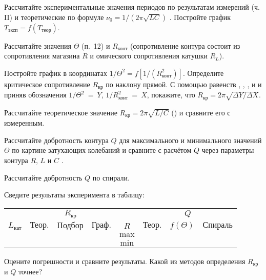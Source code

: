 \begin{lab:task}
	\item Рассчитайте экспериментальные значения периодов по результатам
измерений (ч. II) и теоретические по формуле $\nu_0 = 1/(2\pi\sqrt{LC})$
. Постройте график $T_\text{эксп} = f(T_\text{теор})$.

	\item Рассчитайте значения $\Theta$ (п.~12) и $R_\text{конт}$ (сопротивление
контура состоит из сопротивления магазина $R$ и омического сопротивления катушки
$R_L$).

Постройте график в координатах $1/\Theta^2 =f[1/(R^2_\text{конт})]$. Определите
критическое сопротивление $R_\text{кр}$  по наклону прямой. С помощью равенств
, , , и
 и приняв обозначения $1/\Theta^2~=~Y$, $1/
R^2_\text{конт}~=~X$, покажите, что $R_\text{кр} = 2\pi\sqrt{\Delta Y / \Delta
X}$.

	\item Рассчитайте теоретическое значение $R_\text{кр} = 2\pi\sqrt{L / C}$
() и сравните его с измеренным.

	\item Рассчитайте добротность контура $Q$ для максимального и минимального
значений $\Theta$ по картине затухающих колебаний и сравните с расчётом $Q$
через параметры контура $R$, $L$  и $C$  .

	\item Рассчитайте добротность $Q$ по спирали.

	\item Сведите результаты эксперимента в таблицу:

\begin{center}
\begin{tabular}{|c|c|c|c|c|c|c|c|}
\hline
& \multicolumn{3}{c|}{$R_{\text{кр}}$} &  & \multicolumn{3}{c|}{$Q$} \\
\cline{2-4}
\cline{6-8}
$L_{\text{кат}}$ & $\text{Теор.}$ & $\text{Подбор}$ & $\text{Граф.}$ & $R$ &
$\text{Теор.}$ & $f(\Theta)$ & $\text{Спираль}$  \\
\hline
& & & & $\text{max}$ & & &  \\
& & & & $\text{min}$ & & &  \\
\hline
\end{tabular}
\end{center}


	\item Оцените погрешности и сравните результаты. Какой из методов
определения $R_\text{кр}$ и $Q$ точнее?

\end{lab:task}


